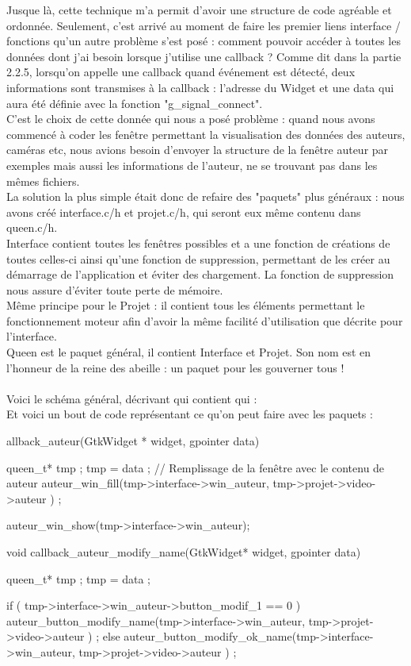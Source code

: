 \documentclass[11pt,french,a4paper]{report}
\begin{document}
Jusque là, cette technique m'a permit d'avoir une structure de code agréable et ordonnée. Seulement, c'est arrivé au moment de 
faire les premier liens interface / fonctions qu'un autre problème s'est posé : comment pouvoir accéder à toutes les données
dont j'ai besoin lorsque j'utilise une callback ? 
Comme dit dans la partie 2.2.5, lorsqu'on appelle une callback quand événement est détecté, deux informations sont 
transmises à la callback : l'adresse du Widget et une data qui aura été définie avec la fonction "g\_signal\_connect". \\

C'est le choix de cette donnée qui nous a posé problème : quand nous avons commencé
à coder les fenêtre permettant la visualisation des données des auteurs, caméras etc, nous avions besoin d'envoyer la structure
de la fenêtre auteur par exemples mais aussi les informations de l'auteur, ne se trouvant pas dans les mêmes fichiers.  \\
La solution la plus simple était donc de refaire des "paquets" plus généraux : nous avons créé interface.c/h et projet.c/h, qui seront eux
même contenu dans queen.c/h. \\
Interface contient toutes les fenêtres possibles et a une fonction de créations de toutes celles-ci ainsi qu'une fonction de suppression, 
permettant de les créer au démarrage de l'application et éviter des chargement. La fonction de suppression nous assure d'éviter toute perte de mémoire.\\
Même principe pour le Projet : il contient tous les éléments permettant le fonctionnement moteur afin d'avoir la même facilité
d'utilisation que décrite pour l'interface. \\
Queen est le paquet général, il contient Interface et Projet. Son nom est en l'honneur de la reine des abeille : 
un paquet pour les gouverner tous ! \\
\\
Voici le schéma général, décrivant qui contient qui :%
\\
Et voici un bout de code représentant ce qu'on peut faire avec les paquets : 

allback\_auteur(GtkWidget * widget, gpointer data)
 {
     queen\_t* tmp ;
     tmp = data ;
     // Remplissage de la fenêtre avec le contenu de auteur
     auteur\_win\_fill(tmp->interface->win\_auteur, tmp->projet->video->auteur ) ;

     auteur\_win\_show(tmp->interface->win\_auteur);
 }
 void callback\_auteur\_modify\_name(GtkWidget* widget, gpointer data) {
         queen\_t* tmp ;
         tmp = data ;

         if ( tmp->interface->win\_auteur->button\_modif\_1 == 0 )
         auteur\_button\_modify\_name(tmp->interface->win\_auteur, tmp->projet->video->auteur ) ;
         else
         auteur\_button\_modify\_ok\_name(tmp->interface->win\_auteur, tmp->projet->video->auteur ) ;
   }
\end{document}
